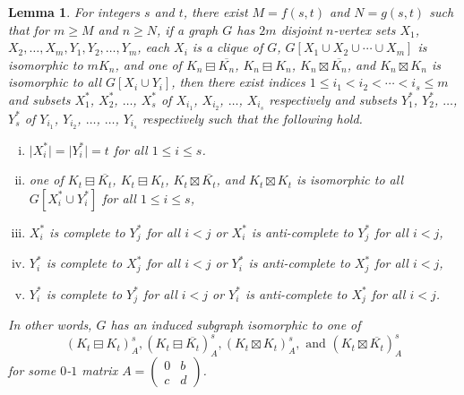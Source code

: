 \documentclass[11pt]{article}
\newtheorem{lemma}[theorem]{Lemma}
\newcommand\abs[1]{\lvert #1\rvert}
\newcommand\mat{\boxminus}
\newcommand\antimat{\boxtimes}
\def\S_#1{\overline{K_{#1}}}
\begin{document}
\begin{lemma}\label{lem:dcm}
  For integers $s$ and $t$, there exist $M=f(s,t)$ and $N=g(s,t)$
  such that
  for $m\ge M$ and $n\ge N$, 
  if a graph $G$ has $2m$ disjoint $n$-vertex sets 
  $X_1$, $X_2,\ldots, X_m,Y_1,Y_2,\ldots,  Y_m$,
  each $X_i$ is a clique of $G$, 
  $G[X_1\cup X_2\cup \cdots\cup X_m]$ is isomorphic to $mK_n$,
  and
  one of $K_n\mat \S_n$,
  $K_n\mat K_n$,  $K_n\antimat \S_n$, 
  and $K_n\antimat K_n$
  is isomorphic to 
  all $G[X_i\cup Y_i]$,
  then
  there exist indices $1\le i_1<i_2<\cdots<i_s\le m$
  and subsets $X_1^*$, $X_2^*$, $\ldots$, $X_s^*$ of $X_{i_1}$, $X_{i_2}$, $\ldots$, $X_{i_s}$ respectively
  and subsets $Y_1^*$, $Y_2^*$, $\ldots$, $Y_s^*$ of $Y_{i_1}$, $Y_{i_2}$, $\ldots$,
  $\ldots$, $Y_{i_s}$ respectively
  such that the following hold.
  \begin{enumerate}[(i)]
  \item $\abs{X_i^*}=\abs{Y_i^*}=t$ for all $1\le i\le s$.
  \item   one of $K_t\mat \S_t$,
    $K_t\mat K_t$,  $K_t\antimat \S_t$, 
    and $K_t\antimat K_t$
    is isomorphic to 
    all $G[X_i^*\cup Y_i^*]$ for all $1\le i\le s$,
  \item $X_i^*$ is complete to $Y_j^*$ for all $i<j$
    or $X_i^*$ is anti-complete to $Y_j^*$ for all $i<j$,
  \item $Y_i^*$ is complete to $X_j^*$ for all $i<j$
    or $Y_i^*$ is anti-complete to $X_j^*$ for all $i<j$,
  \item $Y_i^*$ is complete to $Y_j^*$ for all $i<j$
    or $Y_i^*$ is anti-complete to $X_j^*$ for all $i<j$.
  \end{enumerate}
  In other words, $G$ has an induced subgraph isomorphic to
  one of
  \[(K_t\mat K_t)^s_A,
  (K_t\mat \S_t)^s_A,
  (K_t\antimat K_t)^s_A, \text{ and }
  (K_t\antimat \S_t)^s_A\]
  for some $0$-$1$ matrix $A=
  (\begin{smallmatrix}
    0&b \\c&d 
  \end{smallmatrix})$.
\end{lemma}
\end{document}
